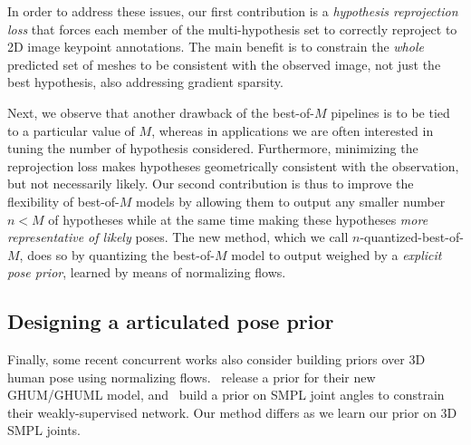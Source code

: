 In order to address these issues, our first contribution is a \emph{hypothesis reprojection loss} that forces each member of the multi-hypothesis set to correctly reproject to 2D image keypoint annotations.
The main benefit is to constrain the \emph{whole} predicted set of meshes to be consistent with the observed image, not just the best hypothesis, also addressing gradient sparsity.

Next, we observe that another drawback of the best-of-{$M$} pipelines is to be tied to a particular value of $M$, whereas in applications we are often interested in tuning the number of hypothesis considered.
Furthermore, minimizing the reprojection loss makes hypotheses geometrically consistent with the observation, but not necessarily likely.
Our second contribution is thus to improve the flexibility of best-of-$M$ models by allowing them to output any smaller number $n<M$ of hypotheses while at the same time making these hypotheses \emph{more representative of likely} poses.
The new method, which we call $n$-quantized-best-of-$M$, does so by quantizing the best-of-$M$ model to output weighed by a \emph{explicit pose prior}, learned by means of normalizing flows.

\subsection{Designing a articulated pose prior}


Finally, some recent concurrent works also consider building priors over 3D human pose using normalizing flows.~\citet{xu-2020-cvpr} release a prior for their new GHUM/GHUML model, and~\citet{weakly-supervised-normflow} build a prior on SMPL joint angles to constrain their weakly-supervised network. Our method differs as we learn our prior on 3D SMPL joints.




